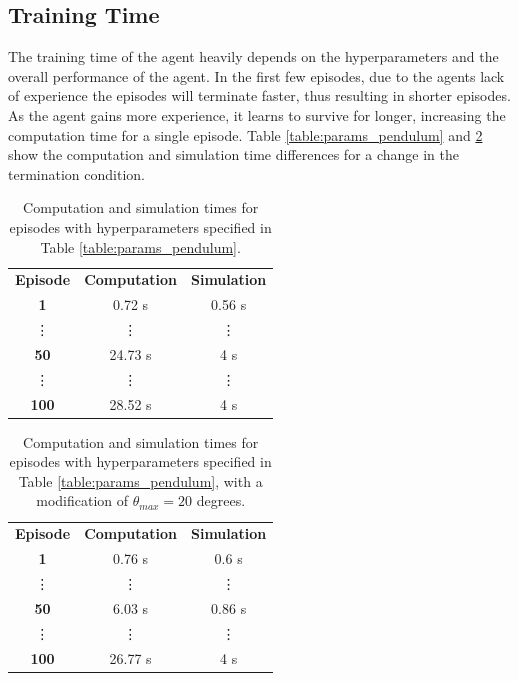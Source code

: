 \documentclass{LTHtwocol} %
\begin{document}
\subsection{Training Time}
The training time of the agent heavily depends on the hyperparameters and the overall performance of the agent. 
In the first few episodes, due to the agents lack of experience the episodes will terminate faster, thus resulting in shorter episodes.
As the agent gains more experience, it learns to survive for longer, increasing the computation time for a single episode.
Table \ref{table:params_pendulum} and \ref{table:other_params_time} show the computation and simulation time differences for a change in the termination condition.
\begin{table}[H]
\centering
\begin{tabular}{|c|c|c|}
\hline
\rowcolor[HTML]{CBCEFB} 
\multicolumn{3}{|c|}{\cellcolor[HTML]{CBCEFB}\textbf{Single Pendulum}} \\ \hline
\rowcolor[HTML]{FFCCC9} 
\textbf{Episode} & \textbf{Computation} & \textbf{Simulation} \\ \hline
\rowcolor[HTML]{FFFFC7} 
\textbf{1} & 0.72 s & 0.56 s\\ \hline
\rowcolor[HTML]{FFFFC7} 
\vdots & \vdots & \vdots \\ \hline
\rowcolor[HTML]{FFFFC7} 
\textbf{50} & 24.73 s & 4 s \\ \hline
\rowcolor[HTML]{FFFFC7} 
\vdots & \vdots & \vdots \\ \hline
\rowcolor[HTML]{FFFFC7} 
\textbf{100} & 28.52 s & 4 s\\ \hline
\end{tabular}
\caption{Computation and simulation times for episodes with hyperparameters specified in Table \ref{table:params_pendulum}.}
\label{table:def_params_time}
\end{table}
\begin{table}[H]
\centering
\begin{tabular}{|c|c|c|}
\hline
\rowcolor[HTML]{CBCEFB} 
\multicolumn{3}{|c|}{\cellcolor[HTML]{CBCEFB}\textbf{Single Pendulum}} \\ \hline
\rowcolor[HTML]{FFCCC9} 
\textbf{Episode} & \textbf{Computation} & \textbf{Simulation} \\ \hline
\rowcolor[HTML]{FFFFC7} 
\textbf{1} & 0.76 s & 0.6 s \\ \hline
\rowcolor[HTML]{FFFFC7} 
\vdots & \vdots & \vdots \\ \hline
\rowcolor[HTML]{FFFFC7} 
\textbf{50} & 6.03 s & 0.86 s \\ \hline
\rowcolor[HTML]{FFFFC7} 
\vdots & \vdots & \vdots \\ \hline
\rowcolor[HTML]{FFFFC7} 
\textbf{100} & 26.77 s & 4 s\\ \hline
\end{tabular}
\caption{Computation and simulation times for episodes with hyperparameters specified in Table \ref{table:params_pendulum}, with a modification of $\theta_{max} = 20$ degrees.}
\label{table:other_params_time}
\end{table}
\end{document}
